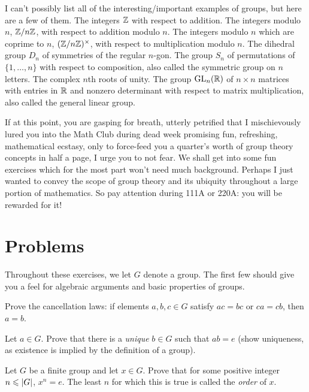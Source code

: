 \documentclass{article}
\DeclareMathOperator{\GL}{GL}
\begin{document}
\begin{example2}
I can't possibly list all of the interesting/important examples of groups, but here are a few of them. The integers $\mathbb{Z}$ with respect to addition. The integers modulo $n$, $\mathbb{Z}/n\mathbb{Z}$, with respect to addition modulo $n$. The integers modulo $n$ which are coprime to $n$, $(\mathbb{Z}/n\mathbb{Z})^\times$, with respect to multiplication modulo $n$. The dihedral group $D_n$ of symmetries of the regular $n$-gon. The group $S_n$ of permutations of $\{1,\dots,n\}$ with respect to composition, also called the symmetric group on $n$ letters. The complex $n$th roots of unity. The group $\GL_n(\RR)$ of $n\times n$ matrices with entries in $\mathbb{R}$ and nonzero determinant with respect to matrix multiplication, also called the general linear group.
\end{example2}

If at this point, you are gasping for breath, utterly petrified that I mischievously lured you into the Math Club during dead week promising fun, refreshing, mathematical ecstasy, only to force-feed you a quarter's worth of group theory concepts in half a page, I urge you to not fear. We shall get into some fun exercises which for the most part won't need much background. Perhaps I just wanted to convey the scope of group theory and its ubiquity throughout a large portion of mathematics. So pay attention during 111A or 220A: you will be rewarded for it!

\section{Problems}

Throughout these exercises, we let $G$ denote a group. The first few should give you a feel for algebraic arguments and basic properties of groups.

\begin{exercise}
Prove the cancellation laws: if elements $a,b,c\in G$ satisfy $ac=bc$ or $ca=cb$, then $a=b$.  
\end{exercise}

\begin{exercise}
Let $a\in G$. Prove that there is a \emph{unique} $b\in G$ such that $ab=e$ (show uniqueness, as existence is implied by the definition of a group).
\end{exercise}

\begin{exercise}
Let $G$ be a finite group and let $x\in G$. Prove that for some positive integer $n\leqslant |G|$, $x^n = e$. The least $n$ for which this is true is called the \emph{order} of $x$. 
\end{exercise}
\end{document}
